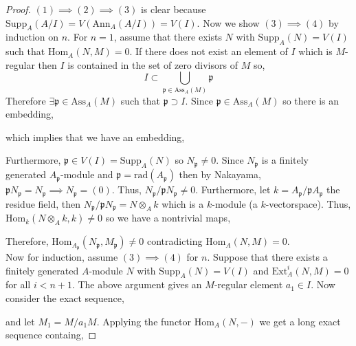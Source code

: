 \documentclass[12pt]{article}
\newcommand{\Ext}[4]{\mathrm{Ext}^{#1}_{#2} \left( #3, #4 \right)}
\newcommand{\Homover}[3]{\mathrm{Hom}_{#1} \left( #2, #3 \right)}
\newcommand{\Ann}[2]{\mathrm{Ann}_{#1}\left(#2\right)}
\newcommand{\Ass}[2]{\mathrm{Ass}_{#1}\left( #2 \right)}
\newcommand{\Supp}[2]{\mathrm{Supp}_{#1}\left( #2 \right)}
\newcommand{\rad}[1]{\mathrm{rad}\left( #1 \right)}
\newcommand{\p}{\mathfrak{p}}
\theoremstyle{remark}
\theoremstyle{definition}
\begin{document}
\begin{proof}
$(1) \implies (2) \implies (3)$ is clear because $\Supp{A}{A/I} = V(\Ann{A}{A/I}) = V(I)$. Now we show $(3) \implies (4)$ by induction on $n$. For $n = 1$, assume that there exists $N$ with $\Supp{A}{N} = V(I)$ such that $\Homover{A}{N}{M} = 0$. If there does not exist an element of $I$ which is $M$-regular then $I$ is contained in the set of zero divisors of $M$ so,
\[ I \subset \bigcup_{\p \in \Ass{A}{M}} \p \]
Therefore $\exists \p \in \Ass{A}{M}$ such that $\p \supset I$.
Since $\p \in \Ass{A}{M}$ so there is an embedding,
\begin{center}
\end{center} 
which implies that we have an embedding,
\begin{center}
\end{center} 
Furthermore, $\p \in V(I) = \Supp{A}{N}$ so $N_\p \neq 0$. Since $N_\p$ is a finitely generated $A_\p$-module and $\p = \rad{A_\p}$ then by Nakayama, $\p N_\p = N_\p \implies N_\p = (0)$. Thus, $N_\p / \p N_\p \neq 0$. Furthermore, let $k = A_\p / \p A_\p$ the residue field, then $N_\p / \p N_\p = N \otimes_A k$ which is a $k$-module (a $k$-vectorspace). Thus, $\Homover{k}{N \otimes_A k}{k} \neq 0$ so we have a nontrivial maps,
\begin{center}
\end{center}
Therefore, $\Homover{A_\p}{N_\p}{M_\p} \neq 0$ contradicting $\Homover{A}{N}{M} = 0$. 
\bigskip\\
Now for induction, assume $(3) \implies (4)$ for $n$. Suppose that there exists a finitely generated $A$-module $N$ with $\Supp{A}{N} = V(I)$ and $\Ext{i}{A}{N}{M} = 0$ for all $i < n + 1$. The above argument gives an $M$-regular element $a_1 \in I$. Now consider the exact sequence,
\begin{center}
\end{center} 
and let $M_1 = M / a_1 M$. Applying the functor $\Homover{A}{N}{-}$ we get a long exact sequence containg,

\end{proof}
\end{document}
